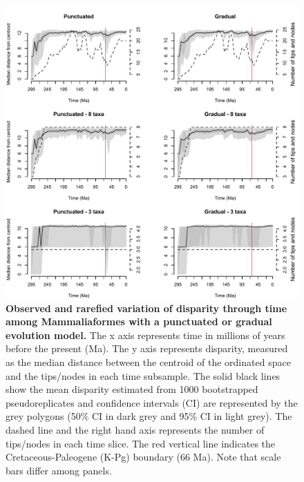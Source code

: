 \begin{figure}
\centering
    \includegraphics[keepaspectratio=true,width=1\textwidth]{Supplementaries/Figures/STD/Slater_full.pdf}
\caption[Mammaliaformes disparity (rarefied)]{\textbf{Observed and rarefied variation of disparity through time among Mammaliaformes with a punctuated or gradual evolution model.} The x axis represents time in millions of years before the present (Ma). The y axis represents disparity, measured as the median distance between the centroid of the ordinated space and the tips/nodes in each time subsample. The solid black lines show the mean disparity estimated from 1000 bootstrapped pseudoreplicates and confidence intervals (CI) are represented by the grey polygons (50\% CI in dark grey and 95\% CI in light grey). The dashed line and the right hand axis represents the number of tips/nodes in each time slice. The red vertical line indicates the Cretaceous-Paleogene (K-Pg) boundary (66 Ma). Note that scale bars differ among panels.}
\label{Supp_Mammaliaformes_rarefied}
\end{figure}

